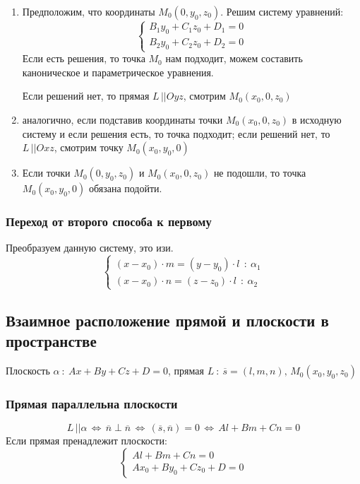 \documentclass{article}
\begin{document}
\begin{enumerate}
    \item Предположим, что координаты $M_0(0,y_0,z_0)$. Решим систему уравнений:
    $$ \begin{cases}B_1y_0+C_1z_0+D_1=0\\B_2y_0+C_2z_0+D_2=0 \end{cases} $$
    Если есть решения, то точка $M_0$ нам подходит, можем составить каноническое и параметрическое уравнения. 
    
    Если решений нет, то прямая $L\,||Oyz$, смотрим $M_0(x_0,0,z_0)$
    \item аналогично, если подставив координаты точки $M_0(x_0,0,z_0)$ в исходную систему и если решения есть, то точка подходит; если решений нет, то $L\,||Oxz$, смотрим точку $M_0(x_0,y_0,0)$
    \item Если точки $M_0(0,y_0,z_0)$ и $M_0(x_0,0,z_0)$ не подошли, то точка $M_0(x_0,y_0,0)$ обязана подойти.
\end{enumerate}
\subsubsection{Переход от второго способа к первому}
Преобразуем данную систему, это изи.
$$ \begin{cases}(x-x_0)\cdot m=(y-y_0)\cdot l\:\::\:\alpha_1\\(x-x_0)\cdot n=(z-z_0)\cdot l\:\::\:\alpha_2\end{cases} $$
\newpage
\subsection{Взаимное расположение прямой и плоскости в пространстве}
Плоскость $\alpha\::\:Ax+By+Cz+D=0$, прямая $L\::\:\overline{s}=(l,m,n),\,M_0(x_0,y_0,z_0)$
\subsubsection{Прямая параллельна плоскости}
$$ L\,||\alpha\,\Leftrightarrow\,\overline{n}\perp\overline{n}\,\Leftrightarrow\,(\overline{s},\overline{n})=0\,\Leftrightarrow\,Al+Bm+Cn=0$$
Если прямая пренадлежит плоскости:
$$ \begin{cases}Al+Bm+Cn=0\\Ax_0+By_0+Cz_0+D=0\end{cases} $$
\end{document}
